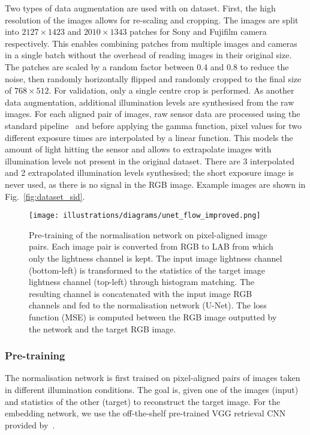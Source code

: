 Two types of data augmentation are used with on dataset. First, the high resolution of the images allows for re-scaling and cropping. The images are split into $2127 \times 1423$ and $2010 \times 1343$ patches for Sony and Fujifilm camera respectively. This enables combining patches from multiple images and cameras in a single batch without the overhead of reading images in their original size. The patches are scaled by a random factor between 0.4 and 0.8 to reduce the noise, then randomly horizontally flipped and randomly cropped to the final size of $768 \times 512$. For validation, only a single centre crop is performed. As another data augmentation, additional illumination levels are synthesised from the raw images. For each aligned pair of images, raw sensor data are processed using the standard pipeline~\cite{szeliski2010computer} and before applying the gamma function, pixel values for two different exposure times are interpolated by a linear function. This models the amount of light hitting the sensor and allows to extrapolate images with illumination levels not present in the original dataset. There are 3 interpolated and 2 extrapolated illumination levels synthesised; the short exposure image is never used, as there is no signal in the RGB image. Example images are shown in Fig.~\ref{fig:dataset_sid}.

\begin{figure}[t] \centering
    \texttt{[image: illustrations/diagrams/unet\_flow\_improved.png]}\\[4pt]

    \caption{Pre-training of the normalisation network on pixel-aligned image pairs. Each image pair is converted from RGB to LAB from which only the lightness channel is kept. The input image lightness channel (bottom-left) is transformed to the statistics of the target image lightness channel (top-left) through histogram matching. The resulting channel is concatenated with the input image RGB channels and fed to the normalisation network (U-Net). The loss function (MSE) is computed between the RGB image outputted by the network and the target RGB image.}
\label{fig:pretrain}
\end{figure}
 

\subsubsection{Pre-training}

The normalisation network is first trained on pixel-aligned pairs of images taken in different illumination conditions. The goal is, given one of the images (input) and statistics of the other (target) to reconstruct the target image. For the embedding network, we use the off-the-shelf pre-trained VGG retrieval CNN provided by~\cite{Radenovic-TPAMI18}.

